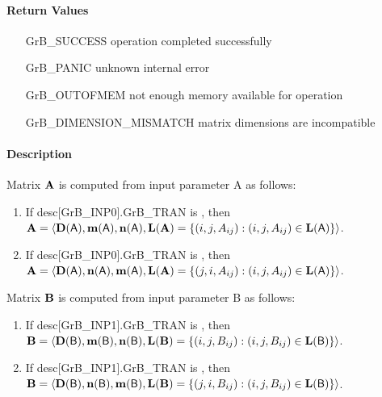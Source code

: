 {\paragraph{Return Values}

\begin{itemize}[leftmargin=2.1in]
\item[{\sf GrB\_SUCCESS}]             operation completed successfully
\item[{\sf GrB\_PANIC}]               unknown internal error
\item[{\sf GrB\_OUTOFMEM}]            not enough memory available for operation
\item[{\sf GrB\_DIMENSION\_MISMATCH}] matrix dimensions are incompatible
\end{itemize}

\raggedbottom
\pagebreak

\paragraph{Description}

Matrix ${\bf A}$ is computed from input parameter {\sf A} as follows:
\begin{enumerate}
\item	If {\sf desc[GrB\_INP0].GrB\_TRAN} is \false, then ${\bf A} = \langle \bold{D}({\sf A}), \bold{m}({\sf A}), \bold{n}({\sf A}),
        \bold{L}({\bf A}) = \{(i,j,A_{ij}) : (i,j,A_{ij}) \in \bold{L}({\sf A})\} \rangle$.
\item	If {\sf desc[GrB\_INP0].GrB\_TRAN} is \true,  then ${\bf A} = \langle \bold{D}({\sf A}), \bold{n}({\sf A}), \bold{m}({\sf A}), 
        \bold{L}({\bf A}) = \{(j,i,A_{ij}) : (i,j,A_{ij}) \in \bold{L}({\sf A})\} \rangle$.
\end{enumerate}

Matrix ${\bf B}$ is computed from input parameter {\sf B} as follows:
\begin{enumerate}
\item	If {\sf desc[GrB\_INP1].GrB\_TRAN} is \false, then ${\bf B} = \langle \bold{D}({\sf B}), \bold{m}({\sf B}), \bold{n}({\sf B}),
        \bold{L}({\bf B}) = \{(i,j,B_{ij}) : (i,j,B_{ij}) \in \bold{L}({\sf B})\} \rangle$.
\item	If {\sf desc[GrB\_INP1].GrB\_TRAN} is \true,  then ${\bf B} = \langle \bold{D}({\sf B}), \bold{n}({\sf B}), \bold{m}({\sf B}), 
        \bold{L}({\bf B}) = \{(j,i,B_{ij}) : (i,j,B_{ij}) \in \bold{L}({\sf B})\} \rangle$.
\end{enumerate}

}
